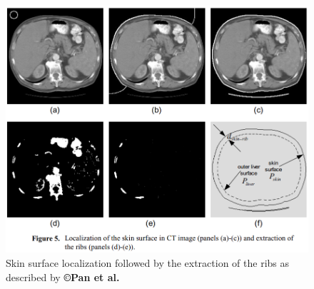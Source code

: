 \documentclass[]{article}
\begin{document}
	\begin{figure}[ht!]
		\centering
		\includegraphics[width=0.5\linewidth]{images/image7}
		\caption{Skin surface localization followed by the extraction of the ribs as described by \textbf{©Pan et al.} \cite{Pan2001}}
		\label{Pan2001_Fig5}
	\end{figure}
	
\end{document}
